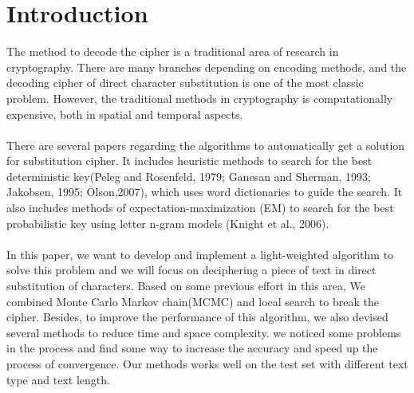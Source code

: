 \documentclass{acmtog} %
\begin{document}
\section{Introduction}

The method to decode the cipher is a traditional area of research in cryptography. There are many branches depending on encoding methods, and the decoding cipher of direct character substitution is one of the most classic problem. However, the traditional methods in cryptography is computationally expensive, both in spatial and temporal aspects.  \\\\
There are several papers regarding the algorithms to automatically get a solution for substitution cipher. It includes heuristic methods to search for the best deterministic key(Peleg and Rosenfeld, 1979; Ganesan and Sherman, 1993; Jakobsen, 1995; Olson,2007), which uses word dictionaries to guide the search. It also includes methods of expectation-maximization (EM) to search for the best probabilistic key using letter n-gram models (Knight et al., 2006).\\\\
In this paper, we want to develop and implement a light-weighted algorithm to solve this problem and we will focus on deciphering a piece of text in direct substitution of characters. Based on some previous effort in this area, We combined Monte Carlo Markov chain(MCMC) and local search to break the cipher. Besides, to improve the performance of this algorithm, we also devised several methods to reduce time and space complexity. we noticed some problems in the process and find some way to increase the accuracy and speed up the process of convergence. Our methods works well on the test set with different text type and text length.
\end{document}

